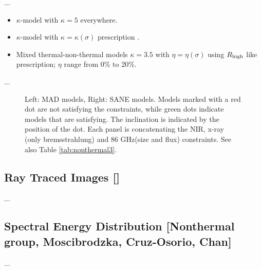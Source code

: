 \documentclass[twocolumn,tighten,dvipsnames,linenumbers]{aastex63}
\begin{document}
...

\begin{itemize}
\item $\kappa$-model with $\kappa = 5$ everywhere.
\item $\kappa$-model with $\kappa = \kappa(\sigma)$ prescription
  \citep{2016ApJ...826...77B}.
\item Mixed thermal-non-thermal models $\kappa = 3.5$ with $\eta =
  \eta(\sigma)$ using ${R_\mathrm{high}}$ like prescription; $\eta$ range from 0\%
  to 20\%.
\end{itemize}

...

\begin{figure}
  \caption{Left: MAD models, Right: SANE models.  Models marked with a red dot are not satisfying the constraints, while green dots indicate models that are satisfying.  The inclination is indicated by the position of the dot. Each panel is concatenating  the NIR, x-ray (only bremsstrahlung) and 86 GHz(size and flux) constraints. See also Table \ref{tab:nonthermal3}. }
  \label{fig:nonthermal3}
\end{figure}

\subsection{Ray Traced Images
  []}
\label{sec:images}

...

\subsection{Spectral Energy Distribution
  [Nonthermal group, Moscibrodzka, Cruz-Osorio, Chan]}
\label{sec:SED}

...



\end{document}
